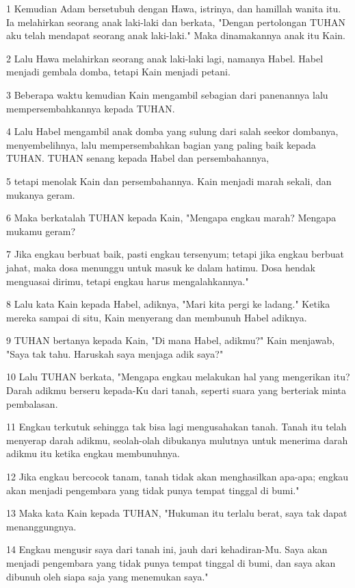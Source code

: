 \par 1 Kemudian Adam bersetubuh dengan Hawa, istrinya, dan hamillah wanita itu. Ia melahirkan seorang anak laki-laki dan berkata, "Dengan pertolongan TUHAN aku telah mendapat seorang anak laki-laki." Maka dinamakannya anak itu Kain.
\par 2 Lalu Hawa melahirkan seorang anak laki-laki lagi, namanya Habel. Habel menjadi gembala domba, tetapi Kain menjadi petani.
\par 3 Beberapa waktu kemudian Kain mengambil sebagian dari panenannya lalu mempersembahkannya kepada TUHAN.
\par 4 Lalu Habel mengambil anak domba yang sulung dari salah seekor dombanya, menyembelihnya, lalu mempersembahkan bagian yang paling baik kepada TUHAN. TUHAN senang kepada Habel dan persembahannya,
\par 5 tetapi menolak Kain dan persembahannya. Kain menjadi marah sekali, dan mukanya geram.
\par 6 Maka berkatalah TUHAN kepada Kain, "Mengapa engkau marah? Mengapa mukamu geram?
\par 7 Jika engkau berbuat baik, pasti engkau tersenyum; tetapi jika engkau berbuat jahat, maka dosa menunggu untuk masuk ke dalam hatimu. Dosa hendak menguasai dirimu, tetapi engkau harus mengalahkannya."
\par 8 Lalu kata Kain kepada Habel, adiknya, "Mari kita pergi ke ladang." Ketika mereka sampai di situ, Kain menyerang dan membunuh Habel adiknya.
\par 9 TUHAN bertanya kepada Kain, "Di mana Habel, adikmu?" Kain menjawab, "Saya tak tahu. Haruskah saya menjaga adik saya?"
\par 10 Lalu TUHAN berkata, "Mengapa engkau melakukan hal yang mengerikan itu? Darah adikmu berseru kepada-Ku dari tanah, seperti suara yang berteriak minta pembalasan.
\par 11 Engkau terkutuk sehingga tak bisa lagi mengusahakan tanah. Tanah itu telah menyerap darah adikmu, seolah-olah dibukanya mulutnya untuk menerima darah adikmu itu ketika engkau membunuhnya.
\par 12 Jika engkau bercocok tanam, tanah tidak akan menghasilkan apa-apa; engkau akan menjadi pengembara yang tidak punya tempat tinggal di bumi."
\par 13 Maka kata Kain kepada TUHAN, "Hukuman itu terlalu berat, saya tak dapat menanggungnya.
\par 14 Engkau mengusir saya dari tanah ini, jauh dari kehadiran-Mu. Saya akan menjadi pengembara yang tidak punya tempat tinggal di bumi, dan saya akan dibunuh oleh siapa saja yang menemukan saya."

